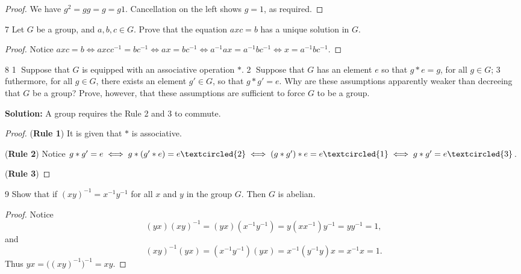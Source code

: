 \begin{proof}
    We have $g^2 = gg = g = g1$.
    Cancellation on the left shows $g = 1$, as required.
\end{proof}

\begin{problem}{7}
    Let $G$ be a group, and $a, b, c \in G$.
    Prove that the equation $axc = b$ has a unique solution in $G$.
\end{problem}
\solved

\begin{proof}
    Notice $axc = b \iff axcc^{-1} = bc^{-1} \iff ax = bc^{-1} \iff a^{-1}ax = a^{-1}bc^{-1} \iff x = a^{-1}bc^{-1}$.
\end{proof}

\begin{problem}{8}
    \textcircled{1} Suppose that $G$ is equipped with an associative operation $*$.
    \textcircled{2} Suppose that $G$ has an element $e$ so that $g * e = g$,
        for all $g \in G$; \textcircled{3} futhermore, for all $g \in G$,
        there exists an element $g' \in G$, so that 
        $g * g' = e$. Why are these assumptions apparently weaker 
        than decreeing that $G$ be a group? Prove, however,
        that these assumptions are sufficient to force $G$ to 
        be a group.
\end{problem}
\solved

\textbf{Solution: } A group requires the Rule 2 and 3 to commute.

\begin{proof}
    (\textbf{Rule 1}) It is given that $*$ is associative.

    (\textbf{Rule 2}) 
    Notice $g * g' = e \iff g * (g' * e) = e \textcircled{2} \iff (g * g') * e  = e \textcircled{1} \iff g * g' = e \textcircled{3}$.

    (\textbf{Rule 3}) 
\end{proof}

\begin{problem}{9}
    Show that if $(xy)^{-1} = x^{-1} y^{-1}$ for all $x$ and $y$
        in the group $G$. Then $G$ is abelian.
\end{problem}
\solved

\begin{proof}
    Notice 
    \[(yx)(xy)^{-1} = (yx)(x^{-1} y^{-1}) = y(x x^{-1}) y^{-1} = y y^{-1} = 1,\]
    and 
    \[(xy)^{-1}(yx) = (x^{-1} y^{-1})(yx) = x^{-1} (y^{-1} y) x = x^{-1} x = 1.\]
    Thus $yx = \bigl((xy)^{-1}\bigr)^{-1} = xy$.
\end{proof}

